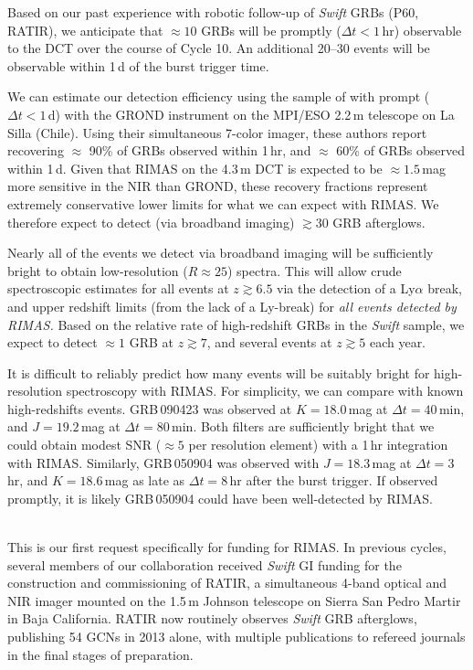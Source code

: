 \documentclass[letterpaper,11pt]{article}
\begin{document}
Based on our past experience with robotic follow-up of \textit{Swift} GRBs (P60,
RATIR), we anticipate that $\approx 10$ GRBs will be promptly ($\Delta t < 1$\,hr) 
observable to the DCT over the course of Cycle 10.  An additional 20--30 events will 
be observable within 1\,d of the burst trigger time.

We can estimate our detection efficiency using the sample of with prompt ($\Delta t
< 1$\,d) with the GROND instrument on the MPI/ESO 2.2\,m telescope on La Silla 
(Chile)\cite{gkk+11}.  Using their simultaneous 7-color imager, these authors report
recovering $\approx$ 90\% of GRBs observed within 1\,hr, and $\approx$ 60\% of
GRBs observed within 1\,d.  Given that RIMAS on the 4.3\,m DCT is expected to be
$\approx 1.5$\,mag more sensitive in the NIR than GROND, these recovery fractions 
represent extremely conservative lower limits for what we can expect with RIMAS. 
We therefore expect to detect (via broadband imaging) $\gtrsim 30$ GRB afterglows.

Nearly all of the events we detect via broadband imaging will be sufficiently 
bright to obtain low-resolution ($R \approx 25$) spectra.  This will allow crude
spectroscopic estimates for all events at $z \gtrsim 6.5$ via the detection of a
Ly$\alpha$ break, and upper redshift limits (from the lack of a Ly-break)
for \textit{all events detected by RIMAS.}  Based on the relative rate of 
high-redshift GRBs in the \textit{Swift} sample\cite{pcb+09,gkk+11}, we expect 
to detect $\approx 1$ GRB at $z \gtrsim 7$, and several events at $z \gtrsim 5$ 
each year. 

It is difficult to reliably predict how many events will be suitably bright 
for high-resolution spectroscopy with RIMAS.  For simplicity, we can compare with known
high-redshifts events.  GRB\,090423\cite{tfl+09} was observed at $K = 18.0$\,mag at
$\Delta t = 40$\,min, and $J = 19.2$\,mag at $\Delta t = 80$\,min.  Both filters are 
sufficiently bright that we could obtain modest SNR ($\approx 5$ per resolution
element) with a 1\,hr integration with RIMAS.  Similarly, GRB\,050904\cite{hnr+05}
was observed with $J = 18.3$\,mag at $\Delta t = 3$\,hr, and $K = 18.6$\,mag as
late as $\Delta t = 8$\,hr after the burst trigger.  If observed promptly, it is likely
GRB\,050904 could have been well-detected by RIMAS.

\smallskip

\smallskip\\
This is our first request specifically for funding for RIMAS.  In previous cycles,
several members of our collaboration received \textit{Swift} GI funding for the 
construction and commissioning of RATIR, a simultaneous 4-band optical and NIR
imager mounted on the 1.5\,m Johnson telescope on Sierra San Pedro Martir in Baja 
California.  RATIR now routinely observes \textit{Swift} GRB afterglows, publishing
54 GCNs in 2013 alone, with multiple publications to refereed journals in the final
stages of preparation. \\
\end{document}
